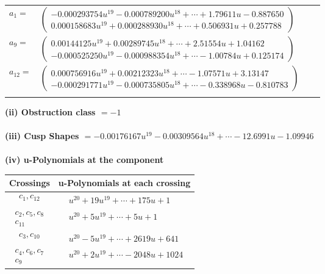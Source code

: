 \documentclass[1p]{elsarticle_modified}
\theoremstyle{definition}
\begin{document}
\begin{tabular}{m{7pt} m{180pt} m{7pt} m{180pt} }
\flushright $a_{1}=$&$\begin{pmatrix}-0.000293754 u^{19}-0.000789200 u^{18}+\cdots+1.79611 u-0.887650\\0.000158683 u^{19}+0.000288930 u^{18}+\cdots+0.506931 u+0.257788\end{pmatrix}$ \\
\flushright $a_{9}=$&$\begin{pmatrix}0.00144125 u^{19}+0.00289745 u^{18}+\cdots+2.51554 u+1.04162\\-0.000525250 u^{19}-0.000988354 u^{18}+\cdots-1.00784 u+0.125174\end{pmatrix}$ \\
\flushright $a_{12}=$&$\begin{pmatrix}0.000756916 u^{19}+0.00212323 u^{18}+\cdots-1.07571 u+3.13147\\-0.000291771 u^{19}-0.000735805 u^{18}+\cdots-0.338968 u-0.810783\end{pmatrix}$\\&\end{tabular}
\flushleft \textbf{(ii) Obstruction class $= -1$}\\~\\
\flushleft \textbf{(iii) Cusp Shapes $= -0.00176167 u^{19}-0.00309564 u^{18}+\cdots-12.6991 u-1.09946$}\\~\\
\newpage\renewcommand{\arraystretch}{1}
\flushleft \textbf{(iv) u-Polynomials at the component}\newline \\
\begin{tabular}{m{50pt}|m{274pt}}
Crossings & \hspace{64pt}u-Polynomials at each crossing \\
\hline $$\begin{aligned}c_{1},c_{12}\end{aligned}$$&$\begin{aligned}
&u^{20}+19 u^{19}+\cdots+175 u+1
\end{aligned}$\\
\hline $$\begin{aligned}c_{2},c_{5},c_{8}\\c_{11}\end{aligned}$$&$\begin{aligned}
&u^{20}+5 u^{19}+\cdots+5 u+1
\end{aligned}$\\
\hline $$\begin{aligned}c_{3},c_{10}\end{aligned}$$&$\begin{aligned}
&u^{20}-5 u^{19}+\cdots+2619 u+641
\end{aligned}$\\
\hline $$\begin{aligned}c_{4},c_{6},c_{7}\\c_{9}\end{aligned}$$&$\begin{aligned}
&u^{20}+2 u^{19}+\cdots-2048 u+1024
\end{aligned}$\\
\hline
\end{tabular}\\~\\
\end{document}
